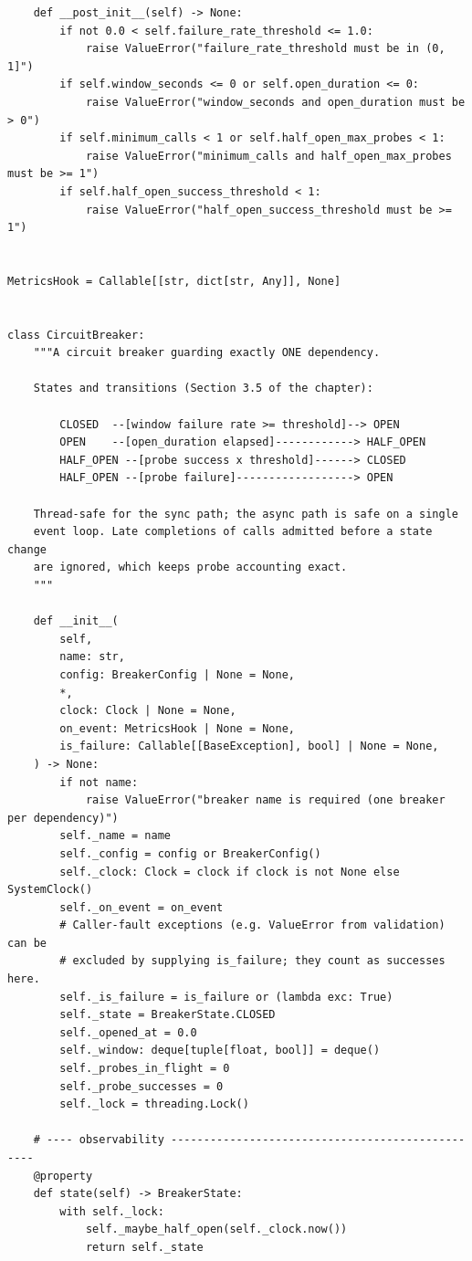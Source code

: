 \begin{verbatim}
    def __post_init__(self) -> None:
        if not 0.0 < self.failure_rate_threshold <= 1.0:
            raise ValueError("failure_rate_threshold must be in (0, 1]")
        if self.window_seconds <= 0 or self.open_duration <= 0:
            raise ValueError("window_seconds and open_duration must be > 0")
        if self.minimum_calls < 1 or self.half_open_max_probes < 1:
            raise ValueError("minimum_calls and half_open_max_probes must be >= 1")
        if self.half_open_success_threshold < 1:
            raise ValueError("half_open_success_threshold must be >= 1")


MetricsHook = Callable[[str, dict[str, Any]], None]


class CircuitBreaker:
    """A circuit breaker guarding exactly ONE dependency.

    States and transitions (Section 3.5 of the chapter):

        CLOSED  --[window failure rate >= threshold]--> OPEN
        OPEN    --[open_duration elapsed]------------> HALF_OPEN
        HALF_OPEN --[probe success x threshold]------> CLOSED
        HALF_OPEN --[probe failure]------------------> OPEN

    Thread-safe for the sync path; the async path is safe on a single
    event loop. Late completions of calls admitted before a state change
    are ignored, which keeps probe accounting exact.
    """

    def __init__(
        self,
        name: str,
        config: BreakerConfig | None = None,
        *,
        clock: Clock | None = None,
        on_event: MetricsHook | None = None,
        is_failure: Callable[[BaseException], bool] | None = None,
    ) -> None:
        if not name:
            raise ValueError("breaker name is required (one breaker per dependency)")
        self._name = name
        self._config = config or BreakerConfig()
        self._clock: Clock = clock if clock is not None else SystemClock()
        self._on_event = on_event
        # Caller-fault exceptions (e.g. ValueError from validation) can be
        # excluded by supplying is_failure; they count as successes here.
        self._is_failure = is_failure or (lambda exc: True)
        self._state = BreakerState.CLOSED
        self._opened_at = 0.0
        self._window: deque[tuple[float, bool]] = deque()
        self._probes_in_flight = 0
        self._probe_successes = 0
        self._lock = threading.Lock()

    # ---- observability -------------------------------------------------
    @property
    def state(self) -> BreakerState:
        with self._lock:
            self._maybe_half_open(self._clock.now())
            return self._state


\end{verbatim}
